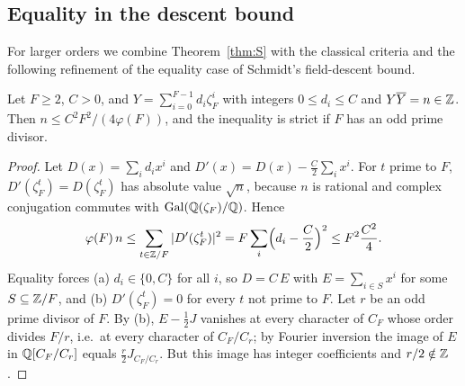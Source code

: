 \subsection{Equality in the descent bound}\label{ssec:Feq}
For larger orders we combine Theorem~\ref{thm:S} with the classical
criteria and the following refinement of the equality case of Schmidt's
field-descent bound.

\begin{lemma}\label{lem:Feq}
Let $F\ge2$, $C>0$, and $Y=\sum_{i=0}^{F-1}d_i\zeta_F^i$ with integers
$0\le d_i\le C$ and $Y\overline{Y}=n\in\mathbb{Z}$. Then
$n\le C^2F^2/(4\varphi(F))$, and the inequality is strict if $F$ has an
odd prime divisor.
\end{lemma}

\begin{proof}
Let $D(x)=\sum_id_ix^i$ and $D'(x)=D(x)-\frac C2\sum_ix^i$. For $t$ prime
to $F$, $D'(\zeta_F^t)=D(\zeta_F^t)$ has absolute value $\sqrt n$, because
$n$ is rational and complex conjugation commutes with
$\operatorname{Gal}(\mathbb{Q}(\zeta_F)/\mathbb{Q})$. Hence
\[
 \varphi(F)\,n\le\sum_{t\in\mathbb{Z}/F}|D'(\zeta_F^t)|^2
 =F\sum_i\Bigl(d_i-\frac C2\Bigr)^2\le F^2\frac{C^2}{4}.
\]
Equality forces (a) $d_i\in\{0,C\}$ for all $i$, so $D=C\,E$ with
$E=\sum_{i\in S}x^i$ for some $S\subseteq\mathbb{Z}/F$, and (b)
$D'(\zeta_F^t)=0$ for every $t$ not prime to $F$. Let $r$ be an odd prime
divisor of $F$. By (b), $E-\frac12J$ vanishes at every character of $C_F$
whose order divides $F/r$, i.e.\ at every character of $C_F/C_r$; by
Fourier inversion the image of $E$ in $\mathbb{Q}[C_F/C_r]$ equals $\frac
r2J_{C_F/C_r}$. But this image has integer coefficients and
$r/2\notin\mathbb{Z}$.
\end{proof}

